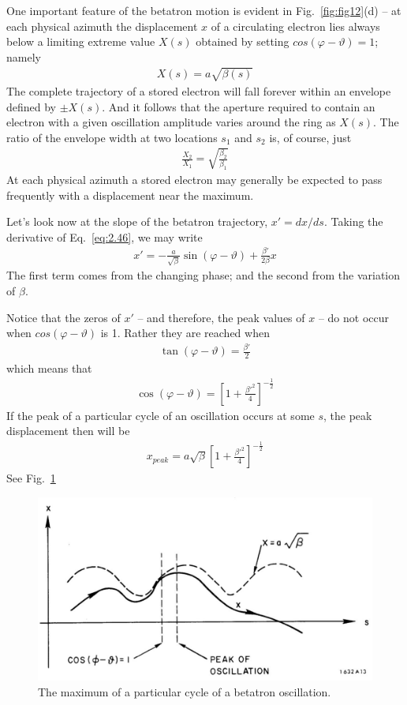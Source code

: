 One important feature of the betatron motion is evident in Fig.~\ref{fig:fig12}(d) -- at each physical azimuth the displacement $x$ of a circulating electron lies always below a limiting extreme value $X(s)$ obtained by setting $cos(\varphi - \vartheta) = 1$; namely
\begin{align}
	X(s) = a\sqrt{\beta(s)}
\end{align}
The complete trajectory of a stored electron will fall forever within an envelope defined by $\pm X(s)$. And it follows that the aperture required to contain an electron with a given oscillation amplitude varies around the ring as $X(s)$. The ratio of the envelope width at two locations $s_1$ and $s_2$ is, of course, just
\begin{align}
	\frac{X_2}{X_1} = \sqrt{\frac{\beta_2}{\beta_1}}
\end{align}
At each physical azimuth a stored electron may generally be expected to pass frequently with a displacement near the maximum.

Let's look now at the slope of the betatron trajectory, $x' = dx/ds$. Taking the derivative of Eq.~\eqref{eq:2.46}, we may write
\begin{align}
	x' = - \frac{a}{\sqrt{\beta}}\sin(\varphi-\vartheta)+\frac{\beta'}{2\beta}x\label{eq:2.52}
\end{align}
The first term comes from the changing phase; and the second from the variation of $\beta$.

Notice that the zeros of $x'$ -- and therefore, the peak values of $x$ -- do not occur when $cos(\varphi - \vartheta)$ is 1. Rather they are reached when
\begin{align}
	\tan(\varphi-\vartheta) = \frac{\beta'}{2}
\end{align}
which means that
\begin{align}
	\cos(\varphi-\vartheta) = \left[1+\frac{\beta'^2}{4}\right]^{-\frac{1}{2}}
\end{align}
If the peak of a particular cycle of an oscillation occurs at some $s$, the peak displacement then will be
\begin{align}
	x_{peak} = a\sqrt{\beta}\left[1+\frac{\beta'^2}{4}\right]^{-\frac{1}{2}}
\end{align}
See Fig.~\ref{fig:fig13}

\begin{figure}[!htb]
	\centering
	\includegraphics[width=0.8\linewidth]{./Figuras/fig13.jpeg}
	\caption{The maximum of a particular cycle of a betatron oscillation.}
	\label{fig:fig13}
\end{figure}

